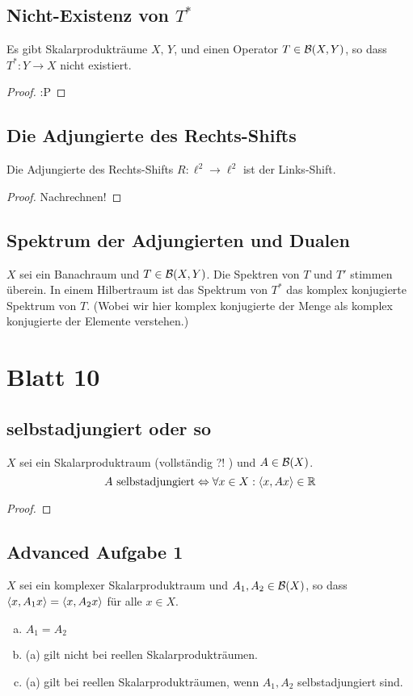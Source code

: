 \documentclass[FunkAnaSkript.tex]{subfiles}
\begin{document}
\subsection{ Nicht-Existenz von $T^*$}
\label{B9.3}
	Es gibt Skalarprodukträume $X,\,Y$, und einen Operator $T\in \mathcal{B}(X,Y)$, so dass $T^* : Y \to X$ nicht existiert.
	
	\begin{proof}
	:P
	\end{proof}


\subsection{ Die Adjungierte des Rechts-Shifts}
\label{B9.4}
	Die Adjungierte des Rechts-Shifts $R:\ell^2 \to \ell ^2$ ist der Links-Shift.
	\begin{proof}
	Nachrechnen!
	\end{proof}


\subsection{ Spektrum der Adjungierten und Dualen}
\label{B9.5}
	$X$ sei ein Banachraum und $T\in \mathcal{B}(X,Y)$. Die Spektren von $T$ und $T'$ stimmen überein. In einem Hilbertraum ist das Spektrum von $T^*$ das komplex konjugierte Spektrum von $T$. (Wobei wir hier komplex konjugierte der Menge als komplex konjugierte der Elemente verstehen.)
	

\newpage
\section{ Blatt 10}

\subsection{ selbstadjungiert oder so}
\label{B10.1}
	$X$ sei ein Skalarproduktraum (vollständig ?! ) und $A \in \mathcal{B}(X)$. 
	$$ A \text{ selbstadjungiert} \Leftrightarrow \forall x \in X : \left \langle x,Ax \right \rangle \in \mathbb{R} $$
	\begin{proof}
	
	\end{proof}


\subsection{ Advanced Aufgabe 1}
\label{B10.2}
	$X$ sei ein komplexer Skalarproduktraum und $A_1, A_2 \in \mathcal{B}(X)$, so dass $\left \langle x, A_1 x \right \rangle = \left \langle x, A_2 x \right \rangle$ für alle $x\in X$.
	\begin{enumerate}[(a)]
		\item $A_1 = A_2$
		\item (a) gilt nicht bei reellen Skalarprodukträumen.
		\item (a) gilt bei reellen Skalarprodukträumen, wenn $A_1,A_2$ selbstadjungiert sind.
	\end{enumerate}
\end{document}

